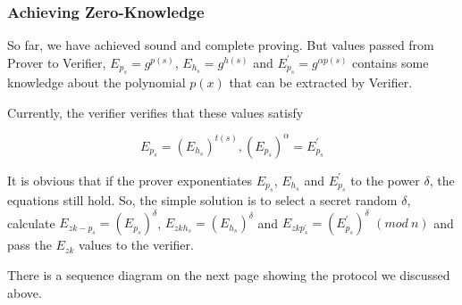 \documentclass[
]{report}
\begin{document}
\subsubsection{Achieving Zero-Knowledge}

So far, we have achieved sound and complete proving. But values passed
from Prover to Verifier, \(E_{p_{s}} = g^{p(s)}\),
\(E_{h_{s}} = g^{h(s)}\) and \(E_{p_{s}}^{'} = g^{\alpha p(s)}\)
contains some knowledge about the polynomial \(p(x)\) that can be
extracted by Verifier.

Currently, the verifier verifies that these values satisfy

\[E_{p_{s}} = \left( E_{h_{s}} \right)^{t(s)},\left( E_{p_{s}} \right)^{\alpha} = E_{p_{s}}^{'}\]

It is obvious that if the prover exponentiates \(E_{p_{s}}\),
\(E_{h_{s}}\) and \(E_{p_{s}}^{'}\) to the power \(\delta\), the
equations still hold. So, the simple solution is to select a secret
random \(\delta\), calculate
\(E_{zk - p_{s}} = \left( E_{p_{s}} \right)^{\delta}\),
\(E_{zkh_{s}} = \left( E_{h_{s}} \right)^{\delta}\) and
\(E_{zkp_{s}^{'}} = \left( E_{p_{s}}^{'} \right)^{\delta}\) \((mod\ n)\)
and pass the \(E_{zk}\) values to the verifier.

There is a sequence diagram on the next page showing the protocol we discussed
above.
\end{document}
